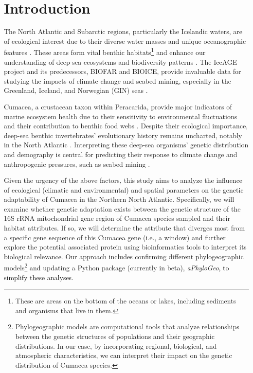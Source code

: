 \section{Introduction}\label{introduction}
The North Atlantic and Subarctic regions, particularly the Icelandic waters, are of ecological interest due to their diverse water masses and unique oceanographic features \citep{schnurr_composition_2014, meisner_benthic_2014, uhlir_adding_2021}. These areas form vital {benthic habitats}\footnote{These are areas on the bottom of the oceans or lakes, including sediments and organisms that live in them.} \citep{levin2009ecological} and enhance our understanding of deep-sea ecosystems and biodiversity patterns \citep{rogers2007corals, danovaro2008exponential, uhlir_adding_2021}. The IceAGE project and its predecessors, BIOFAR and BIOICE, provide invaluable data for studying the impacts of climate change and seabed mining, especially in the Greenland, Iceland, and Norwegian (GIN) seas \citep{meisner_prefacebiodiversity_2018}. 

Cumacea, a crustacean taxon within Peracarida, provide major indicators of marine ecosystem health due to their sensitivity to environmental fluctuations \citep{stransky_diversity_2010} and their contribution to benthic food webs \citep{rehm2009cumacea}. Despite their ecological importance, deep-sea benthic invertebrates’ evolutionary history remains uncharted, notably in the North Atlantic \citep{jennings_phylogeographic_2014}. Interpreting these deep-sea organisms' genetic distribution and demography is central for predicting their response to climate change \citep{jennings_phylogeographic_2014} and anthropogenic pressures, such as seabed mining \citep{meisner_prefacebiodiversity_2018}. 

Given the urgency of the above factors, this study aims to analyze the influence of ecological (climatic and environmental) and spatial parameters on the genetic adaptability of Cumacea in the Northern North Atlantic. Specifically, we will examine whether genetic adaptation exists between the genetic structure of the 16S rRNA mitochondrial gene region of Cumacea species sampled and their habitat attributes. If so, we will determine the attribute that diverges most from a specific gene sequence of this Cumacea gene (i.e., a window) and further explore the potential associated protein using bioinformatics tools to interpret its biological relevance. Our approach includes confirming different {phylogeographic models}\footnote{Phylogeographic models are computational tools that analyze relationships between the genetic structures of populations and their geographic distributions. In our case, by incorporating regional, biological, and atmospheric characteristics, we can interpret their impact on the genetic distribution of Cumacea species.} and updating a Python package (currently in beta), \textit{aPhyloGeo}, to simplify these analyses.

